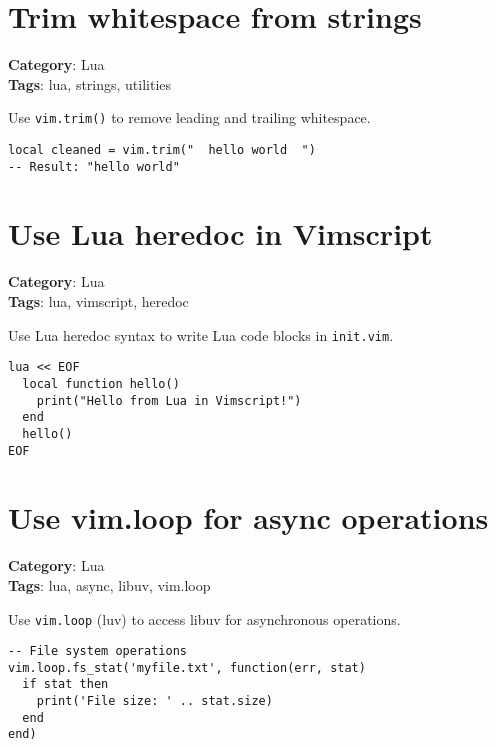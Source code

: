 {{{{{{{\section{Trim whitespace from strings}

\textbf{Category}: Lua\\ \textbf{Tags}: lua, strings, utilities
\vspace{0.5cm}

Use {\footnotesize \Verb§vim.trim()§} to remove leading and trailing whitespace.

\begin{Exa*}{}
\begin{Verbatim}[fontsize=\footnotesize, breaklines, breakanywhere]
local cleaned = vim.trim("  hello world  ")
-- Result: "hello world"
\end{Verbatim}
\end{Exa*}

\section{Use Lua heredoc in Vimscript}

\textbf{Category}: Lua\\ \textbf{Tags}: lua, vimscript, heredoc
\vspace{0.5cm}

Use Lua heredoc syntax to write Lua code blocks in {\footnotesize \Verb§init.vim§}.

\begin{Exa*}{}
\begin{Verbatim}[fontsize=\footnotesize, breaklines, breakanywhere]
lua << EOF
  local function hello()
    print("Hello from Lua in Vimscript!")
  end
  hello()
EOF
\end{Verbatim}
\end{Exa*}

\section{Use vim.loop for async operations}

\textbf{Category}: Lua\\ \textbf{Tags}: lua, async, libuv, vim.loop
\vspace{0.5cm}

Use {\footnotesize \Verb§vim.loop§} (luv) to access libuv for asynchronous operations.

\begin{Exa*}{}
\begin{Verbatim}[fontsize=\footnotesize, breaklines, breakanywhere]
-- File system operations
vim.loop.fs_stat('myfile.txt', function(err, stat)
  if stat then
    print('File size: ' .. stat.size)
  end
end)


\end{Verbatim}
\end{Exa*}}}}}}}}
